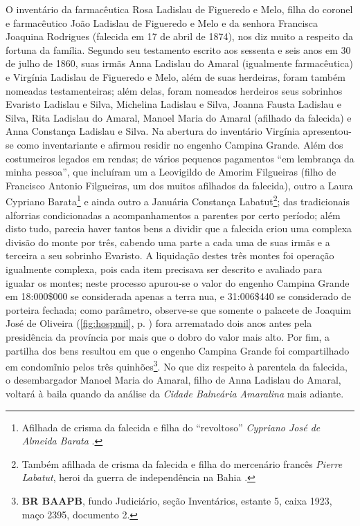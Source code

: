 O inventário da farmacêutica Rosa Ladislau de Figueredo e Melo, filha do coronel e farmacêutico João Ladislau de Figueredo e Melo e da senhora Francisca Joaquina Rodrigues (falecida em 17 de abril de 1874), nos diz muito a respeito da fortuna da família. Segundo seu testamento escrito aos sessenta e seis anos em 30 de julho de 1860, suas irmãs Anna Ladislau do Amaral (igualmente farmacêutica) e Virgínia Ladislau de Figueredo e Melo, além de suas herdeiras, foram também nomeadas testamenteiras; além delas, foram nomeados herdeiros seus sobrinhos Evaristo Ladislau e Silva, Michelina Ladislau e Silva, Joanna Fausta Ladislau e Silva, Rita Ladislau do Amaral, Manoel Maria do Amaral (afilhado da falecida) e Anna Constança Ladislau e Silva. Na abertura do inventário Virgínia apresentou-se como inventariante e afirmou residir no engenho Campina Grande. Além dos costumeiros legados em rendas; de vários pequenos pagamentos ``em lembrança da minha pessoa'', que incluíram um a Leovigildo de Amorim Filgueiras (filho de Francisco Antonio Filgueiras, um dos muitos afilhados da falecida), outro a Laura Cypriano Barata\footnote{Afilhada de crisma da falecida e filha do ``revoltoso'' \textit{Cypriano José de Almeida Barata} \cite{morel_barata_2001}.} e ainda outro a Januária Constança Labatut\footnote{Também afilhada de crisma da falecida e filha do mercenário francês \textit{Pierre Labatut}, heroi da guerra de independência na Bahia \cite{senado_anais_1851}.}; das tradicionais alforrias condicionadas a acompanhamentos a parentes por certo período; além disto tudo, parecia haver tantos bens a dividir que a falecida criou uma complexa divisão do monte por três, cabendo uma parte a cada uma de suas irmãs e a terceira a seu sobrinho Evaristo. A liquidação destes três montes foi operação igualmente complexa, pois cada item precisava ser descrito e avaliado para igualar os montes; neste processo apurou-se o valor do engenho Campina Grande em 18:000\$000 se considerada apenas a terra nua, e 31:006\$440 se considerado de porteira fechada; como parâmetro, observe-se que somente o palacete de Joaquim José de Oliveira (\autoref{fig:hospmil}, p. \pageref{fig:hospmil}) fora arrematado dois anos antes pela presidência da província por mais que o dobro do valor mais alto. Por fim, a partilha dos bens resultou em que o engenho Campina Grande foi compartilhado em condomĩnio pelos três quinhões\footnote{\textbf{BR BAAPB}, fundo Judiciário, seção Inventários, estante 5, caixa 1923, maço 2395, documento 2.}. No que diz respeito à parentela da falecida, o desembargador Manoel Maria do Amaral, filho de Anna Ladislau do Amaral, voltará à baila quando da análise da \textit{Cidade Balneária Amaralina} mais adiante.

